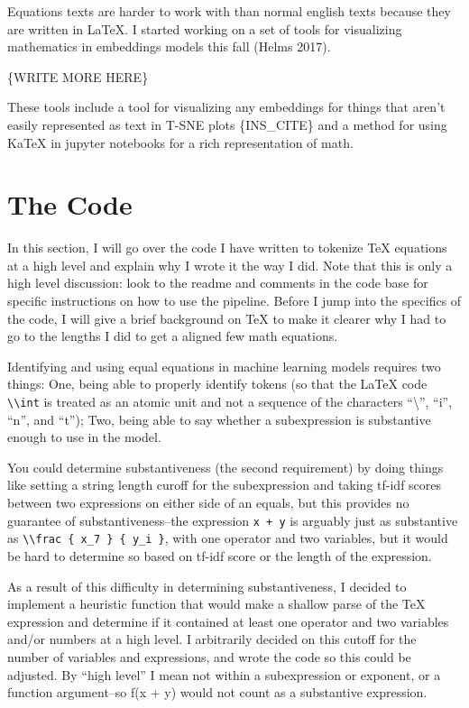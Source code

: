 \documentclass[]{article}
\begin{document}
Equations texts are harder to work with than normal english texts
because they are written in LaTeX. I started working on a set of tools
for visualizing mathematics in embeddings models this fall (Helms 2017).

\{WRITE MORE HERE\}

These tools include a tool for visualizing any embeddings for things
that aren't easily represented as text in T-SNE plots \{INS\_CITE\} and
a method for using KaTeX in jupyter notebooks for a rich representation
of math.

\hypertarget{the-code}{%
\section{The Code}\label{the-code}}

In this section, I will go over the code I have written to tokenize TeX
equations at a high level and explain why I wrote it the way I did. Note
that this is only a high level discussion: look to the readme and
comments in the code base for specific instructions on how to use the
pipeline. Before I jump into the specifics of the code, I will give a
brief background on TeX to make it clearer why I had to go to the
lengths I did to get a aligned few math equations.

Identifying and using equal equations in machine learning models
requires two things: One, being able to properly identify tokens (so
that the LaTeX code \texttt{\textbackslash{}\textbackslash{}int} is
treated as an atomic unit and not a sequence of the characters
``\textbackslash{}'', ``i'', ``n'', and ``t''); Two, being able to say
whether a subexpression is substantive enough to use in the model.

You could determine substantiveness (the second requirement) by doing
things like setting a string length curoff for the subexpression and
taking tf-idf scores between two expressions on either side of an
equals, but this provides no guarantee of substantiveness--the
expression \texttt{x\ +\ y} is arguably just as substantive as
\texttt{\textbackslash{}\textbackslash{}frac\ \{\ x\_7\ \}\ \{\ y\_i\ \}},
with one operator and two variables, but it would be hard to determine
so based on tf-idf score or the length of the expression.

As a result of this difficulty in determining substantiveness, I decided
to implement a heuristic function that would make a shallow parse of the
TeX expression and determine if it contained at least one operator and
two variables and/or numbers at a high level. I arbitrarily decided on
this cutoff for the number of variables and expressions, and wrote the
code so this could be adjusted. By ``high level'' I mean not within a
subexpression or exponent, or a function argument--so f(x + y) would not
count as a substantive expression.
\end{document}
